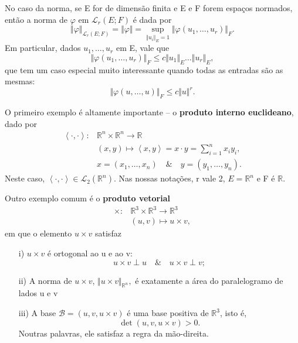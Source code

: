 \documentclass[../analysisII_notes.tex]{subfiles}
\begin{document}
No caso da norma, se E for de dimensão finita e E e F forem espaços normados, então a norma de \(\varphi \) em \(\mathcal{L}_{r}(E; F)\) é dada por
\[
	\Vert \varphi  \Vert_{\mathcal{L}_{r}(E; F)} = \Vert \varphi  \Vert = \sup_{\Vert u_{i} \Vert_{E} = 1}\Vert \varphi(u_1, \dotsc , u_r) \Vert_{F}.
\]
Em particular, dados \(u_1, \dotsc , u_r\) em E, vale que
\[
	\Vert \varphi (u_1, \dotsc , u_{r}) \Vert_{F} \leq c \Vert u_{1} \Vert_{E}\dotsc \Vert u_{r} \Vert_{E},
\]
que tem um caso especial muito interessante quando todas as entradas são as mesmas:
\[
	\Vert \varphi (u, \dotsc , u) \Vert_{F}\leq c\Vert u \Vert^{r}.
\]
\begin{example}
	O primeiro exemplo é altamente importante -- o \textbf{produto interno euclideano}, dado por
	\begin{align*}
		\left< \cdot , \cdot  \right>: & \mathbb{R}^{n}\times \mathbb{R}^{n}\rightarrow  \mathbb{R}                           \\
		                               & (x, y)\longmapsto \left< x, y \right> = x \cdot y = \sum\limits_{i=1}^{n}x_{i}y_{i}, \\
		                               & x = (x_1, \dotsc , x_{n}) \quad\&\quad y = (y_1,\dotsc ,y_{n}).
	\end{align*}
	Neste caso, \(\left< \cdot , \cdot  \right>\in \mathcal{L}_{2}(\mathbb{R}^{n})\). Nas nossas notações, r vale 2, \(E = \mathbb{R}^{n}\) e F é \(\mathbb{R}\).
\end{example}
\begin{example}
	Outro exemplo comum é o \textbf{produto vetorial}
	\begin{align*}
		\times : & \mathbb{R}^{3}\times \mathbb{R}^{3}\rightarrow \mathbb{R}^{3} \\
		         & (u, v)\mapsto u \times v,
	\end{align*}
	em que o elemento \(u\times v\) satisfaz
	\begin{itemize}
		\item[i)] \(u\times v\) é ortogonal ao u e ao v:
		      \[
			      u\times v \perp u \quad\&\quad u\times v\perp v;
		      \]
		\item[ii)] A norma de \(u\times v\), \(\Vert u\times v \Vert_{\mathbb{R}^{n}},\) é exatamente a área do paralelogramo de lados u e v
		\item[iii)] A base \(\mathcal{B} = (u, v, u\times v)\) é uma base positiva  de \(\mathbb{R}^{3}\), isto é,
		      \[
			      \det{(u, v, u\times v)} > 0.
		      \]
		      Noutras palavras, ele satisfaz a regra da mão-direita.
	\end{itemize}
\end{example}
\end{document}
